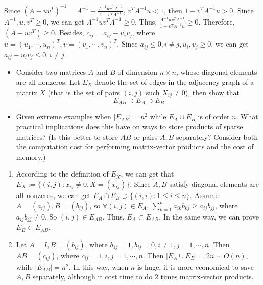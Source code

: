 \documentclass{ctexart}
\begin{document}
\begin{solution}
  Since \((A-uv^T)^{-1}=A^{-1}  + \frac{A^{-1}uv^TA^{-1}}{1-v^TA^{-1}} \), \( v^TA^{-1}u <1 \), then \(1-v^TA^{-1}u >0 \). 
  Since \(A^{-1},u, v^T \geq 0 \), we can get \(A^{-1}uv^TA^{-1} \geq 0 \). Thus, \(\frac{A^{-1}uv^TA^{-1}}{1-v^TA^{-1}u} \geq0 \). 
  Therefore, \((A-uv^T)\geq0 \). Besides, \(c_{ij}=a_{ij}-u_iv_j \), where \(u=(u_1,\cdots,u_n)^T,v=(v_1,\cdots,v_n)^T \). 
  Since \(a_{ij}\leq 0, i \neq j, u_i,v_j \geq 0 \), we can get \(  a_{ij} - u_iv_j \leq 0, i \neq j\).
\end{solution}

 \begin{problem} 
   \begin{itemize}
     \item   Consider two matrices \(A \) and \(B \) of dimension \(n \times n \), whose diagonal 
       elements are all nonzeros. Let \(E_X \) denote the set of edges in the 
       adjacency graph of a matrix \(X \) (that is the set of pairs \((i,j) \) 
       such \(  X_{ij} \neq 0\)), then show that \[
         E_{AB} \supset E_A \supset E_B
       \]
     \item Given extreme examples when \(|E_{AB}| =n^2 \) while \(E_A \cup E_B \) is of 
       order \(n \). What practical implications does this have on ways to store 
       products of sparse matrices? (Is this better to store \(AB \) or pairs \(A,B \) 
       separately? Consider both the computation cost for performing matrix-vector 
       products and the cost of memory.)
   \end{itemize}
 \end{problem}
 \begin{solution}
  \begin{enumerate}
    \item According to the definition of \(E_X \), we can get that \( E_X :=\{(i,j):x_{ij} \neq 0, X=(x_{ij})\} \). 
      Since \(A,B \) satisfy diagonal elements are all nonzeros, we can get \(E_A \cap E_B \supset \{(i,i):1 \leq i \leq n\} \).
      Assume \(A =(a_{ij}),B=(b_{ij}) \), so \(\forall (i,j) \in E_{A} \), \(\sum_{k=1}^{n}a_{ik}b_{kj} \geq a_{ij}b_{jj}  \), where \(a_{ij}b_{jj} \neq 0 \).
      So \((i,j) \in E_{AB} \). Thus, \(E_{A} \subset E_{AB} \). In the same way, we can prove \(E_{B} \subset E_{AB} \).
    \item Let \(A=I, B=(b_{ij}) \), where \(b_{1j}=1, b_{ij}=0, i \neq 1, j=1,\cdots,n \).  Then \(AB=(c_{ij}) \), where \(c_{ij}=1, i,j=1,\cdots,n \).
      Then \(|E_{A} \cup E_{B}| =2n \sim O(n) \), while \(|E_{AB}|= n^2\). In this way, 
      when \(n \) is huge, it is more economical to save \(A,B \) separately, although it cost time to do \(2 \) times 
      matrix-vector products.
  \end{enumerate}
 \end{solution}
\end{document}
